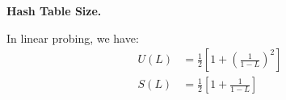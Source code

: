 \textbf{Hash Table Size.}\\
    \begin{solution}
    In linear probing, we have:\\
    \begin{equation*}
      \begin{aligned}
        U(L) &=\frac{1}{2}\left[1+\left(\frac{1}{1-L}\right)^{2}\right] \\ 
        S(L) &=\frac{1}{2}\left[1+\frac{1}{1-L}\right] 
      \end{aligned}
    \end{equation*}
  \end{solution}
